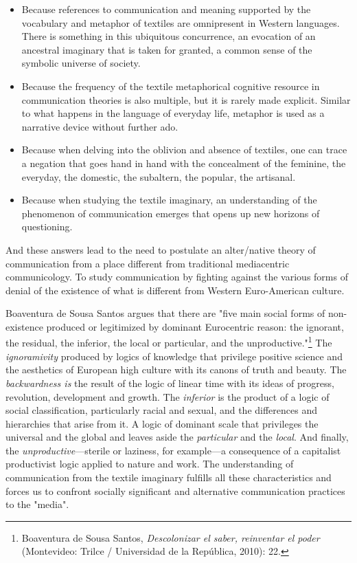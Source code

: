 \documentclass{tufte-handout}
\begin{document}
\begin{itemize}
\item
  Because references to communication and meaning supported by the
  vocabulary and metaphor of textiles are omnipresent in Western
  languages. There is something in this ubiquitous concurrence, an
  evocation of an ancestral imaginary that is taken for granted, a
  common sense of the symbolic universe of society.
\item
  Because the frequency of the textile metaphorical cognitive resource
  in communication theories is also multiple, but it is rarely made
  explicit. Similar to what happens in the language of everyday life,
  metaphor is used as a narrative device without further ado.
\item
  Because when delving into the oblivion and absence of textiles, one
  can trace a negation that goes hand in hand with the concealment of
  the feminine, the everyday, the domestic, the subaltern, the popular,
  the artisanal.
\item
  Because when studying the textile imaginary, an understanding of the
  phenomenon of communication emerges that opens up new horizons of
  questioning.
\end{itemize}

And these answers lead to the need to postulate an alter/native theory
of communication from a place different from traditional mediacentric
communicology. To study communication by fighting against the various
forms of denial of the existence of what is different from Western
Euro-American culture.

Boaventura de Sousa Santos argues that there are "five main social forms
of non-existence produced or legitimized by dominant Eurocentric reason:
the ignorant, the residual, the inferior, the local or particular, and
the unproductive."\footnote{Boaventura de Sousa Santos,
  \emph{Descolonizar el saber, reinventar el poder} (Montevideo: Trilce
  / Universidad de la República, 2010): 22.} The \emph{ignoramivity}
produced by logics of knowledge that privilege positive science and the
aesthetics of European high culture with its canons of truth and beauty.
The \emph{backwardness is} the result of the logic of linear time with
its ideas of progress, revolution, development and growth. The
\emph{inferior} is the product of a logic of social classification,
particularly racial and sexual, and the differences and hierarchies that
arise from it. A logic of dominant scale that privileges the universal
and the global and leaves aside the \emph{particular} and the
\emph{local}. And finally, the \emph{unproductive}---sterile or
laziness, for example---a consequence of a capitalist productivist logic
applied to nature and work. The understanding of communication from the
textile imaginary fulfills all these characteristics and forces us to
confront socially significant and alternative communication practices to
the "media".
\end{document}
